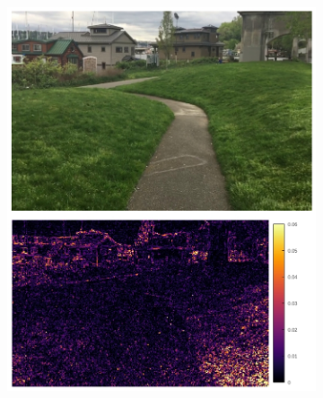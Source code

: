 \documentclass{article}
\begin{document}
\begin{figure}
\begin{subfigure}{0.25\textwidth}
\end{subfigure}%
\begin{subfigure}{0.25\textwidth}
	\centering
    \includegraphics[width=1\linewidth]{qua_imgs/720p_240fps_1_film.jpg}


\end{subfigure}
\end{figure}
\end{document}
